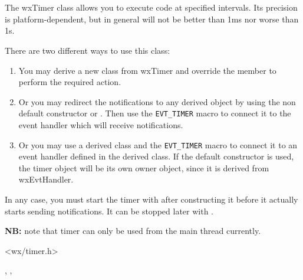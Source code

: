\section{}\label{wxtimer}

The wxTimer class allows you to execute code at specified intervals. Its
precision is platform-dependent, but in general will not be better than 1ms nor
worse than 1s.

There are two different ways to use this class:

\begin{enumerate}
\item You may derive a new class from wxTimer and override the 
 member to perform the required action.
\item Or you may redirect the notifications to any 
 derived object by using the non default
constructor or . Then use the {\tt EVT\_TIMER} 
macro to connect it to the event handler which will receive 
 notifications.
\item Or you may use a derived class and the {\tt EVT\_TIMER} 
macro to connect it to an event handler defined in the derived class.
If the default constructor is used, the timer object will be its
own owner object, since it is derived from wxEvtHandler.
\end{enumerate}

In any case, you must start the timer with  
after constructing it before it actually starts sending notifications. It can
be stopped later with .

{\bf NB:} note that timer can only be used from the main thread currently.




<wx/timer.h>


, , 


\label{wxtimerwxtimer}



